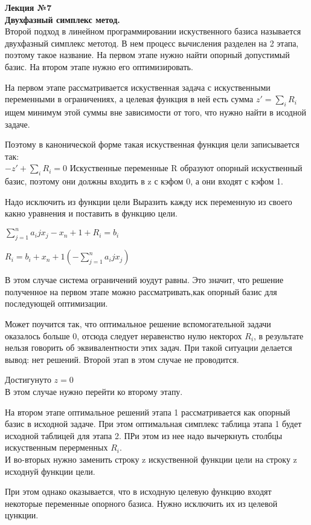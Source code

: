 \LARGE{ \textbf {Лекция №7}}\\
\Large{ \textbf {Двухфазный симплекс метод.}}\\
Второй подход в линейном программировании искуственного базиса называется двухфазный симплекс метотод.
В нем процесс вычисления разделен на 2 этапа, поэтому такое название.
На первом этапе нужно найти опорный допустимый базис.
На втором этапе нужно его оптимизировать.

На первом этапе рассматривается искуственная задача с искуственными переменными в ограничениях, а целевая функция в ней
есть сумма $z' = \sum\limits_i{R_i} $ ищем минимум этой суммы вне зависимости от того, что нужно найти в исодной задаче.

Поэтому в канонической форме такая искуственная функция цели записывается так:\\
$-z' +  \sum\limits_i{R_i} = 0 $
Искуственные переменные R образуют опорный искуственный базис, поэтому они должны входить в z с кэфом 0, а они входят с кэфом 1.

Надо исключить из функции цели
Выразить кажду иск переменную из своего какно уравнения и поставить в функцию цели.

$
\sum\limits_{j=1}^n{a_ij x_j} - x_n+1 + R_i = b_i
$

$
R_i = b_i +  x_n+1 (- \sum\limits_{j=1}^n{a_ij x_j} )
$

В этом случае система ограничений юудут равны. Это значит, что решение полученное на первом этапе можно рассматривать,как опорный базис для последующей оптимизации.

Может поучится так, что оптимальное решение вспомогательной задачи оказалось больше 0, отсюда следует неравенство нулю некторох $R_i$, в результате нельзя говорить об эквивалентности этих задач.
При такой ситуации делается вывод: нет решений. Второй этап в этом случае не проводится.

Достигунуто $z = 0$\\
В этом случае нужно перейти ко второму этапу.

На втором этапе оптимальное решений этапа 1 рассматривается как опорный базис в исходной задаче.
При этом оптимальная симплекс таблица этапа 1 будет исходной таблицей для этапа 2.
ПРи этом из нее надо вычеркнуть столбцы искуственным перерменных $R_i$. \\
И во-вторых нужно заменить строку z искуственной функции цели на строку z исходнуй функции цели.

При этом однако оказывается, что в исходную целевую функцию входят некоторые переменные опорного базиса.
Нужно исключить их из целевой цункции.

